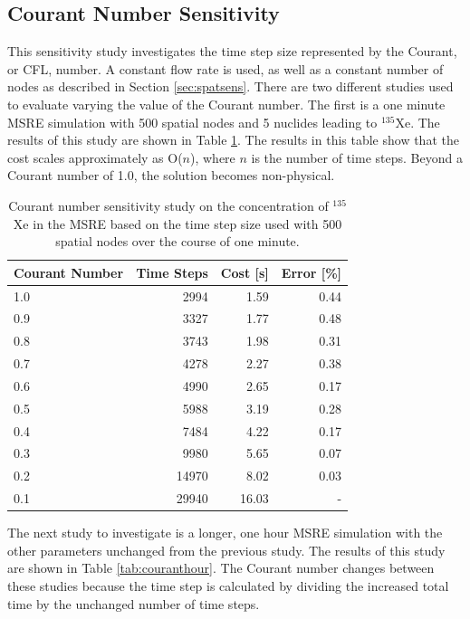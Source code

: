 \documentclass{style/nseJournal}
\begin{document}
\subsection{Courant Number Sensitivity}
\label{sec:CFL}
This sensitivity study investigates the time step size represented by the Courant, or CFL, number.
A constant flow rate is used, as well as a constant number of nodes as described in Section \ref{sec:spatsens}.
There are two different studies used to evaluate varying the value of the Courant number.
The first is a one minute MSRE simulation with 500 spatial nodes and 5 nuclides leading to $^{135}$Xe.
The results of this study are shown in Table \ref{tab:courantmin}.
The results in this table show that the cost scales approximately as O($n$), where $n$ is the number of time steps.
Beyond a Courant number of 1.0, the solution becomes non-physical.

\begin{table}[!ht]
    \centering
    \caption{Courant number sensitivity study on the concentration of $^{135}$Xe in the MSRE based on the time step size used with 500 spatial nodes over the course of one minute.}
    \begin{tabular}{l r r r}
    \hline
Courant Number & Time Steps & Cost [s] & Error [\%] \\
\hline
1.0 & 2994 &1.59 & 0.44 \\
0.9 & 3327 & 1.77 & 0.48 \\
0.8 & 3743 & 1.98 & 0.31 \\
0.7 & 4278 & 2.27 & 0.38 \\
0.6 & 4990 & 2.65 & 0.17 \\
0.5 & 5988 & 3.19 & 0.28 \\
0.4 & 7484 & 4.22 & 0.17 \\
0.3 & 9980 & 5.65 & 0.07 \\
0.2 & 14970 & 8.02 & 0.03 \\
0.1 & 29940 & 16.03 & - \\
\hline
    \end{tabular}
    \label{tab:courantmin}
\end{table}

The next study to investigate is a longer, one hour MSRE simulation with the other parameters unchanged from the previous study.
The results of this study are shown in Table \ref{tab:couranthour}.
The Courant number changes between these studies because the time step is calculated by dividing the increased total time by the unchanged number of time steps.
\end{document}

